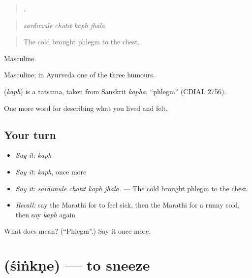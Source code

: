 \begin{quote}
   .
\end{quote}

\begin{quote}
\emph{sardīmuḷe chātīt kaph jhālā.}
\end{quote}

\begin{quote}
The cold brought phlegm to the chest.
\end{quote}

Masculine.

Masculine; in Ayurveda one of the three humours.

\begin{cousinweb}
\textbf{} (\emph{kaph}) is a tatsama, taken from Sanskrit \emph{kapha}, \textquotedblleft{}phlegm\textquotedblright{} (CDIAL 2756).
\end{cousinweb}

\begin{grammarlens}[title={What you've built}]
One more word for describing what you lived and felt.
\end{grammarlens}

\subsection*{Your turn}
\begin{itemize}
\raggedright
  \item \emph{Say it:} \emph{kaph}
  \item \emph{Say it:} \emph{kaph}, once more
  \item \emph{Say it:} \emph{sardīmuḷe chātīt kaph jhālā.} — The cold brought phlegm to the chest.
  \item \emph{Recall:} say the Marathi for to feel sick, then the Marathi for a runny cold, then say \emph{kaph} again
\end{itemize}

\begin{tcolorbox}[breakable,colback=teal!4,colframe=teal!35!black,title={Before you move on}]
What does  mean? (\textquotedblleft{}Phlegm\textquotedblright{}.) Say it once more.
\end{tcolorbox}
\section[\texorpdfstring{\mr{शिंकणे} (śiṅkṇe)}{शिंकणे (śiṅkṇe)}]{ (śiṅkṇe) — to sneeze}

